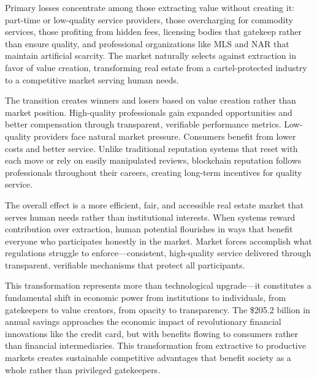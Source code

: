 Primary losses concentrate among those extracting value without creating it: part-time or low-quality service providers, those overcharging for commodity services, those profiting from hidden fees, licensing bodies that gatekeep rather than ensure quality, and professional organizations like MLS and NAR that maintain artificial scarcity. The market naturally selects against extraction in favor of value creation, transforming real estate from a cartel-protected industry to a competitive market serving human needs.

The transition creates winners and losers based on value creation rather than market position. High-quality professionals gain expanded opportunities and better compensation through transparent, verifiable performance metrics. Low-quality providers face natural market pressure. Consumers benefit from lower costs and better service. Unlike traditional reputation systems that reset with each move or rely on easily manipulated reviews, blockchain reputation follows professionals throughout their careers, creating long-term incentives for quality service.

The overall effect is a more efficient, fair, and accessible real estate market that serves human needs rather than institutional interests. When systems reward contribution over extraction, human potential flourishes in ways that benefit everyone who participates honestly in the market. Market forces accomplish what regulations struggle to enforce---consistent, high-quality service delivered through transparent, verifiable mechanisms that protect all participants.

This transformation represents more than technological upgrade---it constitutes a fundamental shift in economic power from institutions to individuals, from gatekeepers to value creators, from opacity to transparency. The \$205.2 billion in annual savings approaches the economic impact of revolutionary financial innovations like the credit card, but with benefits flowing to consumers rather than financial intermediaries. This transformation from extractive to productive markets creates sustainable competitive advantages that benefit society as a whole rather than privileged gatekeepers.